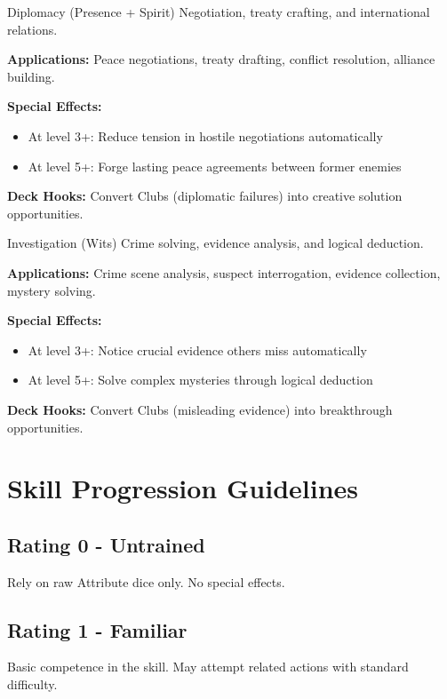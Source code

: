 \begin{skillbox}{Diplomacy (Presence + Spirit)}
Negotiation, treaty crafting, and international relations.

\textbf{Applications:} Peace negotiations, treaty drafting, conflict resolution, alliance building.

\textbf{Special Effects:}
\begin{itemize}
    \item At level 3+: Reduce tension in hostile negotiations automatically
    \item At level 5+: Forge lasting peace agreements between former enemies
\end{itemize}

\textbf{Deck Hooks:} Convert Clubs (diplomatic failures) into creative solution opportunities.
\end{skillbox}

\begin{skillbox}{Investigation (Wits)}
Crime solving, evidence analysis, and logical deduction.

\textbf{Applications:} Crime scene analysis, suspect interrogation, evidence collection, mystery solving.

\textbf{Special Effects:}
\begin{itemize}
    \item At level 3+: Notice crucial evidence others miss automatically
    \item At level 5+: Solve complex mysteries through logical deduction
\end{itemize}

\textbf{Deck Hooks:} Convert Clubs (misleading evidence) into breakthrough opportunities.
\end{skillbox}

\section*{Skill Progression Guidelines}

\subsection*{Rating 0 - Untrained}
Rely on raw Attribute dice only. No special effects.

\subsection*{Rating 1 - Familiar}
Basic competence in the skill. May attempt related actions with standard difficulty.

